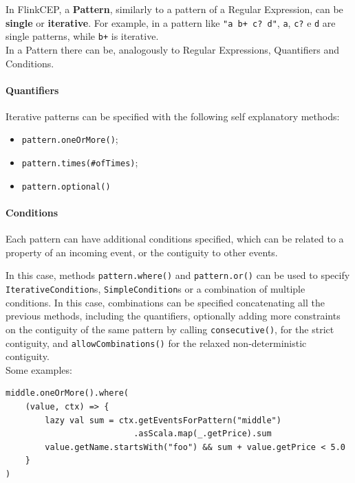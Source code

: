 In FlinkCEP, a \textbf{Pattern}, similarly to a pattern of a Regular Expression, can be \textbf{single} or \textbf{iterative}. For example, in a pattern like \verb|"a b+ c? d"|, \verb|a|, \verb|c?| e \verb|d| are single patterns, while \verb|b+| is iterative.
\\

In a Pattern there can be, analogously to Regular Expressions, Quantifiers and Conditions.

\paragraph{Quantifiers}

Iterative patterns can be specified with the following self explanatory methods:

\begin{itemize}
    \item \verb|pattern.oneOrMore()|;
    \item \verb|pattern.times(#ofTimes)|;
    \item \verb|pattern.optional()|
\end{itemize}

\paragraph{Conditions}

Each pattern can have additional conditions specified, which can be related to a property of an incoming event, or the contiguity to other events.

In this case, methods \verb|pattern.where()| and \verb|pattern.or()| can be used to specify \verb|IterativeCondition|s, \verb|SimpleCondition|s or a combination of multiple conditions. In this case, combinations can be specified concatenating all the previous methods, including the quantifiers, optionally adding more constraints on the contiguity of the same pattern by calling \verb|consecutive()|, for the strict contiguity, and \verb|allowCombinations()| for the relaxed non-deterministic contiguity.
\\
Some examples:

\begin{code}
\label{code:iterative-cond}
\begin{verbatim}
middle.oneOrMore().where(
    (value, ctx) => {
        lazy val sum = ctx.getEventsForPattern("middle")
                          .asScala.map(_.getPrice).sum
        value.getName.startsWith("foo") && sum + value.getPrice < 5.0
    }
)
\end{verbatim}
\end{code}~\\

